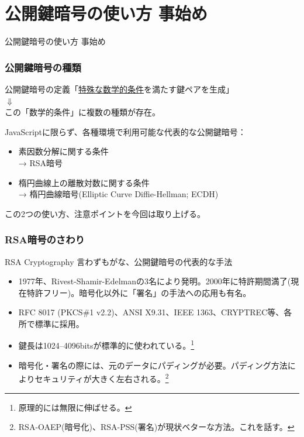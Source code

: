 \documentclass[12pt,dvipdfmx]{beamer}
\begin{document}
\section{公開鍵暗号の使い方 事始め}
\begin{frame}
\centering
{\Large 公開鍵暗号の使い方 事始め}
\end{frame}

\begin{frame}
\frametitle{公開鍵暗号の種類}
\begin{exampleblock}{}
\begin{center}
公開鍵暗号の定義「\underline{特殊な数学的条件}を満たす鍵ペアを生成」\\[0.5ex]
 $\Downarrow$\\[0.5ex]
この「数学的条件」に複数の種類が存在。
\end{center}
\end{exampleblock}

\vspace{2ex}

JavaScriptに限らず、各種環境で利用可能な代表的な公開鍵暗号：
\begin{itemize}
 \item 素因数分解に関する条件\\ → \alert{RSA暗号}
 \item 楕円曲線上の離散対数に関する条件\\ → \alert{楕円曲線暗号(Elliptic Curve Diffie-Hellman; ECDH)}
\end{itemize}
この2つの使い方、注意ポイントを今回は取り上げる。
\end{frame}

\begin{frame}
\frametitle{RSA暗号のさわり}
\begin{block}{RSA Cryptography}
言わずもがな、公開鍵暗号の代表的な手法
\begin{itemize}
 \item 1977年、Rivest-Shamir-Edelmanの3名により発明。2000年に特許期間満了(現在特許フリー)。暗号化以外に「署名」の手法への応用も有名。
 \item RFC 8017 (PKCS\#1 v2.2)、ANSI X9.31、IEEE 1363、CRYPTREC等、各所で標準に採用。
 \item 鍵長は1024--4096bitsが標準的に使われている。\footnote[frame]{原理的には無限に伸ばせる。}
 \item 暗号化・署名の際には、元のデータにパディングが必要。\alert{パディング方法によりセキュリティが大きく左右される。}\footnote[frame]{RSA-OAEP(暗号化)、RSA-PSS(署名)が現状ベターな方法。これを話す。}
\end{itemize}
\end{block}

\end{frame}
\end{document}
